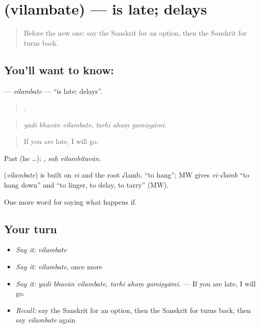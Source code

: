 \section[\texorpdfstring{\sk{विलम्बते} (vilambate)}{विलम्बते (vilambate)}]{ (vilambate) — is late; delays}

\label{lesson:SA-C371-vilambate}



\begin{quote}
Before the new one: say the Sanskrit for an option, then the Sanskrit for turns back.
\end{quote}

\subsection*{You'll want to know: }
\textbf{} — \emph{vilambate} — \textquotedblleft{}is late; delays\textquotedblright{}.

\begin{quote}
  ,   
\end{quote}

\begin{quote}
\emph{yadi bhavān vilambate, tarhi ahaṃ gamiṣyāmi.}
\end{quote}

\begin{quote}
If you are late, I will go.
\end{quote}

Past (he …):  , \emph{saḥ vilambitavān}.

\begin{cousinweb}
\textbf{} (\emph{vilambate}) is built on \emph{vi} and the root √lamb, \textquotedblleft{}to hang\textquotedblright{}; MW gives \emph{vi-√lamb} \textquotedblleft{}to hang down\textquotedblright{} and \textquotedblleft{}to linger, to delay, to tarry\textquotedblright{} (MW).
\end{cousinweb}

\begin{grammarlens}[title={What you've built}]
One more word for saying what happens if.
\end{grammarlens}

\subsection*{Your turn}
\begin{itemize}
\raggedright
  \item \emph{Say it:} \emph{vilambate}
  \item \emph{Say it:} \emph{vilambate}, once more
  \item \emph{Say it:} \emph{yadi bhavān vilambate, tarhi ahaṃ gamiṣyāmi.} — If you are late, I will go.
  \item \emph{Recall:} say the Sanskrit for an option, then the Sanskrit for turns back, then say \emph{vilambate} again
\end{itemize}

